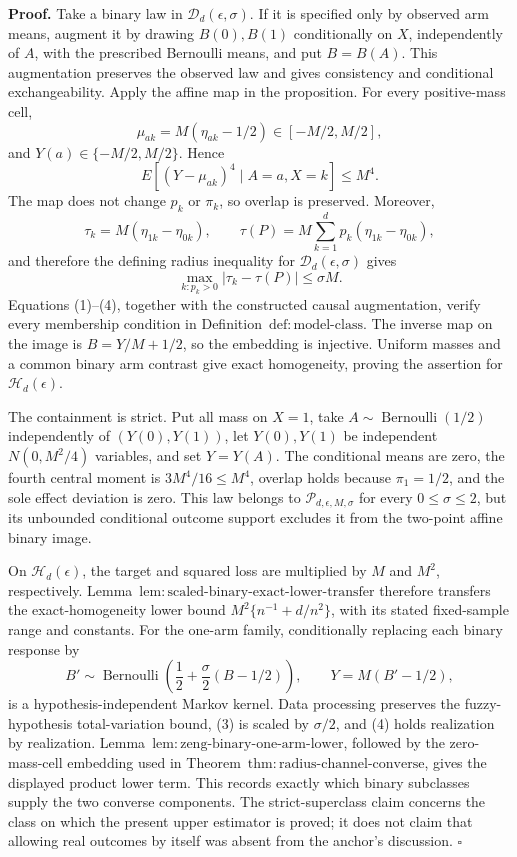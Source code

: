 \textbf{Proof.}
Take a binary law in \(\mathcal D_d(\epsilon,\sigma)\).  If it is specified only by observed arm means, augment it by drawing \(B(0),B(1)\) conditionally on \(X\), independently of \(A\), with the prescribed Bernoulli means, and put \(B=B(A)\).  This augmentation preserves the observed law and gives consistency and conditional exchangeability.  Apply the affine map in the proposition.  For every positive-mass cell,
\[
 \mu_{ak}=M(\eta_{ak}-1/2)\in[-M/2,M/2],
\tag{1}
\]
and \(Y(a)\in\{-M/2,M/2\}\).  Hence
\[
 E[(Y-\mu_{ak})^4\mid A=a,X=k]\le M^4.
\tag{2}
\]
The map does not change \(p_k\) or \(\pi_k\), so overlap is preserved.  Moreover,
\[
 \tau_k=M(\eta_{1k}-\eta_{0k}),\qquad
 \tau(P)=M\sum_{k=1}^dp_k(\eta_{1k}-\eta_{0k}),
\tag{3}
\]
and therefore the defining radius inequality for \(\mathcal D_d(\epsilon,\sigma)\) gives
\[
 \max_{k:p_k>0}|\tau_k-\tau(P)|\le\sigma M.
\tag{4}
\]
Equations (1)--(4), together with the constructed causal augmentation, verify every membership condition in Definition~\(\mathrm{def:model\text{-}class}\).  The inverse map on the image is \(B=Y/M+1/2\), so the embedding is injective.  Uniform masses and a common binary arm contrast give exact homogeneity, proving the assertion for \(\mathcal H_d(\epsilon)\).

The containment is strict.  Put all mass on \(X=1\), take \(A\sim\operatorname{Bernoulli}(1/2)\) independently of \((Y(0),Y(1))\), let \(Y(0),Y(1)\) be independent \(N(0,M^2/4)\) variables, and set \(Y=Y(A)\).  The conditional means are zero, the fourth central moment is \(3M^4/16\le M^4\), overlap holds because \(\pi_1=1/2\), and the sole effect deviation is zero.  This law belongs to \(\mathcal P_{d,\epsilon,M,\sigma}\) for every \(0\le\sigma\le2\), but its unbounded conditional outcome support excludes it from the two-point affine binary image.

On \(\mathcal H_d(\epsilon)\), the target and squared loss are multiplied by \(M\) and \(M^2\), respectively.  Lemma~\(\mathrm{lem:scaled\text{-}binary\text{-}exact\text{-}lower\text{-}transfer}\) therefore transfers the exact-homogeneity lower bound \(M^2\{n^{-1}+d/n^2\}\), with its stated fixed-sample range and constants.  For the one-arm family, conditionally replacing each binary response by
\[
 B'\sim\operatorname{Bernoulli}\!\left(\frac12+\frac\sigma2(B-1/2)\right),
 \qquad Y=M(B'-1/2),
\tag{5}
\]
is a hypothesis-independent Markov kernel.  Data processing preserves the fuzzy-hypothesis total-variation bound, (3) is scaled by \(\sigma/2\), and (4) holds realization by realization.  Lemma~\(\mathrm{lem:zeng\text{-}binary\text{-}one\text{-}arm\text{-}lower}\), followed by the zero-mass-cell embedding used in Theorem~\(\mathrm{thm:radius\text{-}channel\text{-}converse}\), gives the displayed product lower term.  This records exactly which binary subclasses supply the two converse components.  The strict-superclass claim concerns the class on which the present upper estimator is proved; it does not claim that allowing real outcomes by itself was absent from the anchor's discussion. \(\square\)